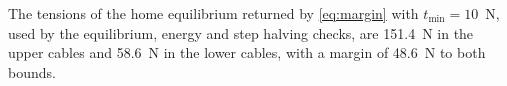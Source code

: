 \documentclass[10pt]{article}
\begin{document}
\noindent The tensions of the home equilibrium returned by \eqref{eq:margin} with $t_{\min}=10$~N, used by the equilibrium, energy and step halving checks, are 151.4~N in the upper cables and 58.6~N in the lower cables, with a margin of 48.6~N to both bounds.



\end{document}
